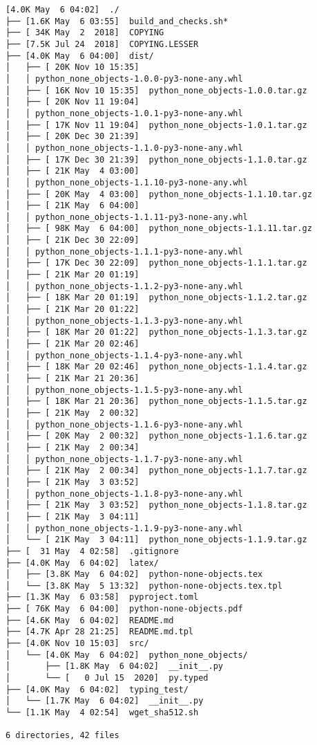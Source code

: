 \documentclass{article}
\begin{document}
\begin{verbatim}
[4.0K May  6 04:02]  ./
├── [1.6K May  6 03:55]  build_and_checks.sh*
├── [ 34K May  2  2018]  COPYING
├── [7.5K Jul 24  2018]  COPYING.LESSER
├── [4.0K May  6 04:00]  dist/
│   ├── [ 20K Nov 10 15:35]
│   │ python_none_objects-1.0.0-py3-none-any.whl
│   ├── [ 16K Nov 10 15:35]  python_none_objects-1.0.0.tar.gz
│   ├── [ 20K Nov 11 19:04]
│   │ python_none_objects-1.0.1-py3-none-any.whl
│   ├── [ 17K Nov 11 19:04]  python_none_objects-1.0.1.tar.gz
│   ├── [ 20K Dec 30 21:39]
│   │ python_none_objects-1.1.0-py3-none-any.whl
│   ├── [ 17K Dec 30 21:39]  python_none_objects-1.1.0.tar.gz
│   ├── [ 21K May  4 03:00]
│   │ python_none_objects-1.1.10-py3-none-any.whl
│   ├── [ 20K May  4 03:00]  python_none_objects-1.1.10.tar.gz
│   ├── [ 21K May  6 04:00]
│   │ python_none_objects-1.1.11-py3-none-any.whl
│   ├── [ 98K May  6 04:00]  python_none_objects-1.1.11.tar.gz
│   ├── [ 21K Dec 30 22:09]
│   │ python_none_objects-1.1.1-py3-none-any.whl
│   ├── [ 17K Dec 30 22:09]  python_none_objects-1.1.1.tar.gz
│   ├── [ 21K Mar 20 01:19]
│   │ python_none_objects-1.1.2-py3-none-any.whl
│   ├── [ 18K Mar 20 01:19]  python_none_objects-1.1.2.tar.gz
│   ├── [ 21K Mar 20 01:22]
│   │ python_none_objects-1.1.3-py3-none-any.whl
│   ├── [ 18K Mar 20 01:22]  python_none_objects-1.1.3.tar.gz
│   ├── [ 21K Mar 20 02:46]
│   │ python_none_objects-1.1.4-py3-none-any.whl
│   ├── [ 18K Mar 20 02:46]  python_none_objects-1.1.4.tar.gz
│   ├── [ 21K Mar 21 20:36]
│   │ python_none_objects-1.1.5-py3-none-any.whl
│   ├── [ 18K Mar 21 20:36]  python_none_objects-1.1.5.tar.gz
│   ├── [ 21K May  2 00:32]
│   │ python_none_objects-1.1.6-py3-none-any.whl
│   ├── [ 20K May  2 00:32]  python_none_objects-1.1.6.tar.gz
│   ├── [ 21K May  2 00:34]
│   │ python_none_objects-1.1.7-py3-none-any.whl
│   ├── [ 21K May  2 00:34]  python_none_objects-1.1.7.tar.gz
│   ├── [ 21K May  3 03:52]
│   │ python_none_objects-1.1.8-py3-none-any.whl
│   ├── [ 21K May  3 03:52]  python_none_objects-1.1.8.tar.gz
│   ├── [ 21K May  3 04:11]
│   │ python_none_objects-1.1.9-py3-none-any.whl
│   └── [ 21K May  3 04:11]  python_none_objects-1.1.9.tar.gz
├── [  31 May  4 02:58]  .gitignore
├── [4.0K May  6 04:02]  latex/
│   ├── [3.8K May  6 04:02]  python-none-objects.tex
│   └── [3.8K May  5 13:32]  python-none-objects.tex.tpl
├── [1.3K May  6 03:58]  pyproject.toml
├── [ 76K May  6 04:00]  python-none-objects.pdf
├── [4.6K May  6 04:02]  README.md
├── [4.7K Apr 28 21:25]  README.md.tpl
├── [4.0K Nov 10 15:03]  src/
│   └── [4.0K May  6 04:02]  python_none_objects/
│       ├── [1.8K May  6 04:02]  __init__.py
│       └── [   0 Jul 15  2020]  py.typed
├── [4.0K May  6 04:02]  typing_test/
│   └── [1.7K May  6 04:02]  __init__.py
└── [1.1K May  4 02:54]  wget_sha512.sh

6 directories, 42 files
\end{verbatim}
\end{document}
